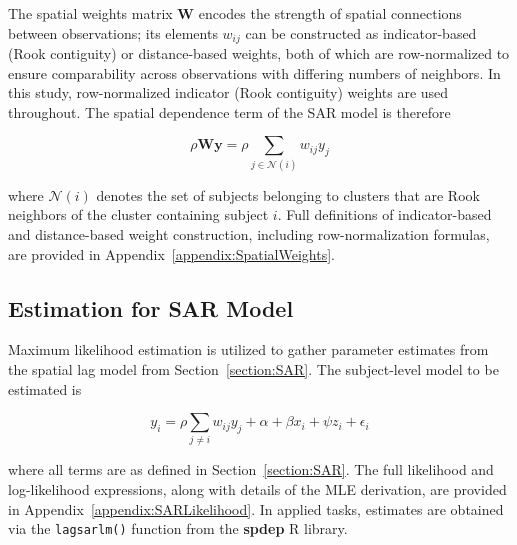 \documentclass{article}[11pt]
\begin{document}


The spatial weights matrix $\mathbf{W}$ encodes the strength of spatial connections between observations; its elements $w_{ij}$ can be constructed as indicator-based (Rook contiguity) or distance-based weights, both of which are row-normalized to ensure comparability across observations with differing numbers of neighbors. In this study, row-normalized indicator (Rook contiguity) weights are used throughout. The spatial dependence term of the SAR model is therefore

\begin{equation}\label{Equation:SpatialDepTerm}
    \rho\mathbf{Wy} = \rho\sum_{j \in \mathcal{N}(i)}w_{ij}y_j
\end{equation}

where $\mathcal{N}(i)$ denotes the set of subjects belonging to clusters that are Rook neighbors of the cluster containing subject $i$. Full definitions of indicator-based and distance-based weight construction, including row-normalization formulas, are provided in Appendix~\ref{appendix:SpatialWeights}.

\subsection{Estimation for SAR Model}

Maximum likelihood estimation is utilized to gather parameter estimates from the spatial lag model from Section~\ref{section:SAR}\cite{ord_estimation_1975}\cite{bivand_comparing_2015}\cite{bivand_computing_2013}. The subject-level model to be estimated is

\begin{equation}\label{Equation:SARestimation}
    y_i = \rho \sum_{j\neq i}w_{ij}y_{j} + \alpha + \beta x_i + \psi z_i + \epsilon_i
\end{equation}

where all terms are as defined in Section~\ref{section:SAR}. The full likelihood and log-likelihood expressions, along with details of the MLE derivation, are provided in Appendix~\ref{appendix:SARLikelihood}. In applied tasks, estimates are obtained via the \texttt{lagsarlm()} function from the \textbf{spdep} R library\cite{bivand_r_2022}.
\end{document}

